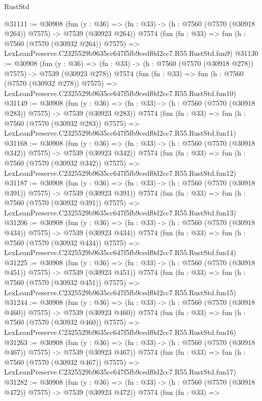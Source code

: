 \begin{lexlean}{RustStd}
\begin{coremodule}
@31111 := @30908
    (fun (y : @36) => (fn : @33) -> (h : @7560 (@7570 (@30918 @264)) @7575) -> @7539 (@30923 @264))
    @7574
    (fun (fn : @33) =>
    fun (h : @7560 (@7570 (@30932 @264)) @7575) =>
    LexLeanPreserve.C2325529b9635cc647f5fb9cedf0d2cc7.R55.RustStd.fun9)
@31130 := @30908
    (fun (y : @36) => (fn : @33) -> (h : @7560 (@7570 (@30918 @278)) @7575) -> @7539 (@30923 @278))
    @7574
    (fun (fn : @33) =>
    fun (h : @7560 (@7570 (@30932 @278)) @7575) =>
    LexLeanPreserve.C2325529b9635cc647f5fb9cedf0d2cc7.R55.RustStd.fun10)
@31149 := @30908
    (fun (y : @36) => (fn : @33) -> (h : @7560 (@7570 (@30918 @283)) @7575) -> @7539 (@30923 @283))
    @7574
    (fun (fn : @33) =>
    fun (h : @7560 (@7570 (@30932 @283)) @7575) =>
    LexLeanPreserve.C2325529b9635cc647f5fb9cedf0d2cc7.R55.RustStd.fun11)
@31168 := @30908
    (fun (y : @36) => (fn : @33) -> (h : @7560 (@7570 (@30918 @342)) @7575) -> @7539 (@30923 @342))
    @7574
    (fun (fn : @33) =>
    fun (h : @7560 (@7570 (@30932 @342)) @7575) =>
    LexLeanPreserve.C2325529b9635cc647f5fb9cedf0d2cc7.R55.RustStd.fun12)
@31187 := @30908
    (fun (y : @36) => (fn : @33) -> (h : @7560 (@7570 (@30918 @391)) @7575) -> @7539 (@30923 @391))
    @7574
    (fun (fn : @33) =>
    fun (h : @7560 (@7570 (@30932 @391)) @7575) =>
    LexLeanPreserve.C2325529b9635cc647f5fb9cedf0d2cc7.R55.RustStd.fun13)
@31206 := @30908
    (fun (y : @36) => (fn : @33) -> (h : @7560 (@7570 (@30918 @434)) @7575) -> @7539 (@30923 @434))
    @7574
    (fun (fn : @33) =>
    fun (h : @7560 (@7570 (@30932 @434)) @7575) =>
    LexLeanPreserve.C2325529b9635cc647f5fb9cedf0d2cc7.R55.RustStd.fun14)
@31225 := @30908
    (fun (y : @36) => (fn : @33) -> (h : @7560 (@7570 (@30918 @451)) @7575) -> @7539 (@30923 @451))
    @7574
    (fun (fn : @33) =>
    fun (h : @7560 (@7570 (@30932 @451)) @7575) =>
    LexLeanPreserve.C2325529b9635cc647f5fb9cedf0d2cc7.R55.RustStd.fun15)
@31244 := @30908
    (fun (y : @36) => (fn : @33) -> (h : @7560 (@7570 (@30918 @460)) @7575) -> @7539 (@30923 @460))
    @7574
    (fun (fn : @33) =>
    fun (h : @7560 (@7570 (@30932 @460)) @7575) =>
    LexLeanPreserve.C2325529b9635cc647f5fb9cedf0d2cc7.R55.RustStd.fun16)
@31263 := @30908
    (fun (y : @36) => (fn : @33) -> (h : @7560 (@7570 (@30918 @467)) @7575) -> @7539 (@30923 @467))
    @7574
    (fun (fn : @33) =>
    fun (h : @7560 (@7570 (@30932 @467)) @7575) =>
    LexLeanPreserve.C2325529b9635cc647f5fb9cedf0d2cc7.R55.RustStd.fun17)
@31282 := @30908
    (fun (y : @36) => (fn : @33) -> (h : @7560 (@7570 (@30918 @472)) @7575) -> @7539 (@30923 @472))
    @7574
    (fun (fn : @33) =>

\end{coremodule}
\end{lexlean}
